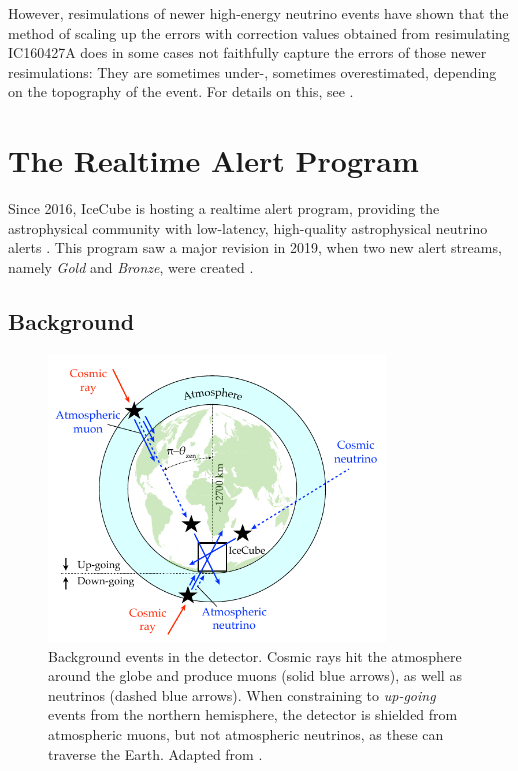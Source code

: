 \documentclass[
    a4paper, %
    fontsize=10pt, %
    twoside=false, %
    numbers=noenddot, %
    fontmethod=tex,
]{kaobook}
\begin{document}
However, resimulations of newer high-energy neutrino events have shown that the method of scaling up the errors with correction values obtained from resimulating IC160427A does in some cases not faithfully capture the errors of those newer resimulations: They are sometimes under-, sometimes overestimated, depending on the topography of the event. For details on this, see \cite{Gualda2021}.

\section{The Realtime Alert Program}\label{ic_alert_program}
Since 2016, IceCube is hosting a realtime alert program, providing the astrophysical community with low-latency, high-quality astrophysical neutrino alerts \cite{Aartsen2017a}. This program saw a major revision in 2019, when two new alert streams, namely \textit{Gold} and \textit{Bronze}, were created .

\subsection{Background}\label{background}

\begin{figure}[htb]
    \includegraphics[width=0.8\textwidth]{ic/ic_background.pdf}
    \caption[Background events]{Background events in the detector. Cosmic rays hit the atmosphere around the globe and produce muons (solid blue arrows), as well as neutrinos (dashed blue arrows). When constraining to \textit{up-going} events from the northern hemisphere, the detector is shielded from atmospheric muons, but not atmospheric neutrinos, as these can traverse the Earth. Adapted from \cite{Ahlers2018a}.}
\end{figure}
\end{document}
